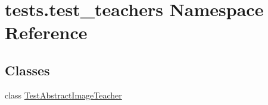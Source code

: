\hypertarget{namespacetests_1_1test__teachers}{}\section{tests.\+test\+\_\+teachers Namespace Reference}
\label{namespacetests_1_1test__teachers}
\subsection*{Classes}
\begin{DoxyCompactItemize}
\item 
class \hyperlink{classtests_1_1test__teachers_1_1TestAbstractImageTeacher}{Test\+Abstract\+Image\+Teacher}
\end{DoxyCompactItemize}
